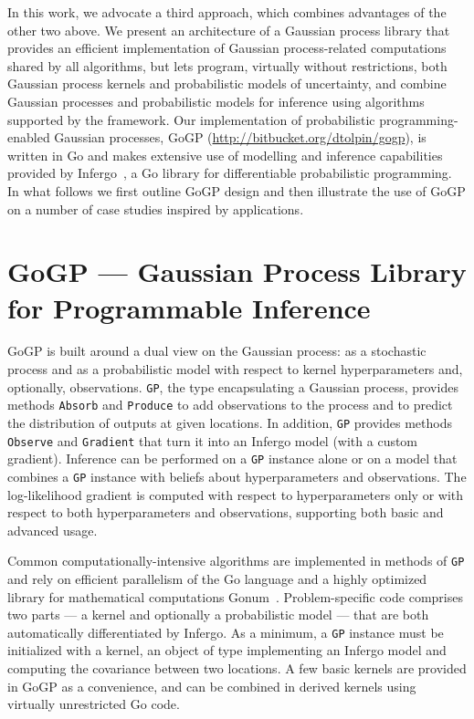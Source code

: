\documentclass[sigplan,review]{acmart}\settopmatter{printfolios=true,printccs=false,printacmref=false}
\begin{document}
In this work, we advocate a third approach, which combines
advantages of the other two above. We present an architecture of
a Gaussian process library that provides an efficient
implementation of Gaussian process-related computations shared
by all algorithms, but lets program, virtually without
restrictions, both Gaussian process kernels and probabilistic
models of uncertainty, and combine Gaussian processes and
probabilistic models for inference using algorithms supported by
the framework. Our implementation of probabilistic
programming-enabled Gaussian processes, GoGP
(\url{http://bitbucket.org/dtolpin/gogp}), is written in Go
and makes extensive use of modelling and inference capabilities
provided by Infergo~\cite{}, a Go library for differentiable
probabilistic programming. In what follows we first outline GoGP
design  and then illustrate the use of GoGP on a number of case
studies inspired by applications.

\section{GoGP --- Gaussian Process Library for Programmable Inference}

GoGP is built around a dual view on the Gaussian process: as a
stochastic process and as a probabilistic model with respect
to kernel hyperparameters and, optionally, observations.
\lstinline{GP}, the type encapsulating a Gaussian process,
provides methods \lstinline{Absorb} and \lstinline{Produce} to 
add observations to the process and to predict the distribution
of outputs at given locations. In addition, \lstinline{GP}
provides methods \lstinline{Observe} and \lstinline{Gradient}
that turn it into an Infergo model (with a custom gradient).
Inference can be performed on a \lstinline{GP} instance alone
or on a model that combines a \lstinline{GP} instance with
beliefs about hyperparameters and observations.  The
log-likelihood gradient is computed with respect to
hyperparameters only or with respect to both hyperparameters and
observations, supporting both basic and advanced usage.

Common computationally-intensive algorithms are implemented in 
methods of \lstinline{GP} and rely on efficient parallelism of
the Go language and a highly optimized library for mathematical 
computations Gonum~\cite{}. Problem-specific code comprises two
parts --- a kernel and optionally a probabilistic model --- that
are both automatically differentiated by Infergo.  As a minimum,
a \lstinline{GP} instance must be initialized with a kernel, an
object of type implementing an Infergo model and computing the
covariance between two locations. A few basic kernels are
provided in GoGP as a convenience, and can be combined in derived
kernels using virtually unrestricted Go code. 
\end{document}
